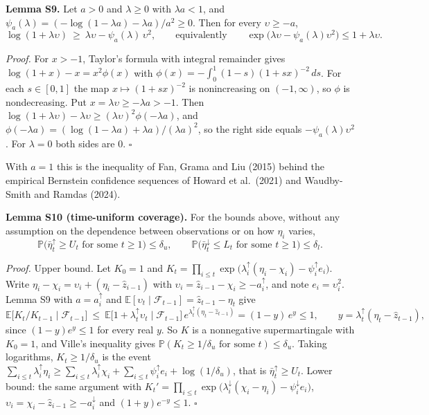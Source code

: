 \documentclass[
]{article}
\begin{document}
\textbf{Lemma S9.} Let \(a > 0\) and \(\lambda \ge 0\) with
\(\lambda a < 1\), and
\(\psi_a(\lambda) = (-\log(1 - \lambda a) - \lambda a)/a^2 \ge 0\). Then
for every \(\upsilon \ge -a\), \[
\log(1 + \lambda\upsilon) \ \ge\ \lambda\upsilon - \psi_a(\lambda)\,\upsilon^2, \qquad\text{equivalently}\qquad \exp\big(\lambda\upsilon - \psi_a(\lambda)\upsilon^2\big) \le 1 + \lambda\upsilon.
\]

\emph{Proof.} For \(x > -1\), Taylor's formula with integral remainder
gives \(\log(1 + x) - x = x^2\phi(x)\) with
\(\phi(x) = -\int_0^1 (1 - s)(1 + sx)^{-2}\,ds\). For each
\(s \in [0, 1]\) the map \(x \mapsto (1 + sx)^{-2}\) is nonincreasing on
\((-1, \infty)\), so \(\phi\) is nondecreasing. Put
\(x = \lambda\upsilon \ge -\lambda a > -1\). Then
\(\log(1 + \lambda\upsilon) - \lambda\upsilon \ge (\lambda\upsilon)^2\phi(-\lambda a)\),
and
\(\phi(-\lambda a) = (\log(1 - \lambda a) + \lambda a)/(\lambda a)^2\),
so the right side equals \(-\psi_a(\lambda)\upsilon^2\). For
\(\lambda = 0\) both sides are 0. \(\square\)

With \(a = 1\) this is the inequality of Fan, Grama and Liu (2015)
behind the empirical Bernstein confidence sequences of Howard et
al.~(2021) and Waudby-Smith and Ramdas (2024).

\textbf{Lemma S10 (time-uniform coverage).} For the bounds above,
without any assumption on the dependence between observations or on how
\(\eta_i\) varies, \[
\mathbb{P}\big(\bar\eta_t^{\uparrow} \ge U_t \text{ for some } t \ge 1\big) \le \delta_u, \qquad \mathbb{P}\big(\bar\eta_t^{\downarrow} \le L_t \text{ for some } t \ge 1\big) \le \delta_l.
\]

\emph{Proof.} Upper bound. Let \(K_0 = 1\) and
\(K_t = \prod_{i \le t} \exp\big(\lambda_i^{\uparrow}(\eta_i - \chi_i) - \psi_i^{\uparrow} e_i\big)\).
Write \(\eta_i - \chi_i = \upsilon_i + (\eta_i - \hat z_{i-1})\) with
\(\upsilon_i = \hat z_{i-1} - \chi_i \ge -a_i^{\uparrow}\), and note
\(e_i = \upsilon_i^2\). Lemma S9 with \(a = a_i^{\uparrow}\) and
\(\mathbb{E}[\upsilon_t \mid \mathcal{F}_{t-1}] = \hat z_{t-1} - \eta_t\)
give \[
\mathbb{E}\big[K_t/K_{t-1} \mid \mathcal{F}_{t-1}\big] \ \le\ \mathbb{E}\big[1 + \lambda_t^{\uparrow}\upsilon_t \mid \mathcal{F}_{t-1}\big]\, e^{\lambda_t^{\uparrow}(\eta_t - \hat z_{t-1})} = (1 - y)\,e^{y} \le 1, \qquad y = \lambda_t^{\uparrow}(\eta_t - \hat z_{t-1}),
\] since \((1 - y)e^y \le 1\) for every real \(y\). So \(K\) is a
nonnegative supermartingale with \(K_0 = 1\), and Ville's inequality
gives
\(\mathbb{P}(K_t \ge 1/\delta_u \text{ for some } t) \le \delta_u\).
Taking logarithms, \(K_t \ge 1/\delta_u\) is the event
\(\sum_{i \le t}\lambda_i^{\uparrow}\eta_i \ge \sum_{i \le t}\lambda_i^{\uparrow}\chi_i + \sum_{i \le t}\psi_i^{\uparrow}e_i + \log(1/\delta_u)\),
that is \(\bar\eta_t^{\uparrow} \ge U_t\). Lower bound: the same
argument with
\(K_t' = \prod_{i \le t}\exp\big(\lambda_i^{\downarrow}(\chi_i - \eta_i) - \psi_i^{\downarrow}e_i\big)\),
\(\upsilon_i = \chi_i - \hat z_{i-1} \ge -a_i^{\downarrow}\) and
\((1 + y)e^{-y} \le 1\). \(\square\)
\end{document}
